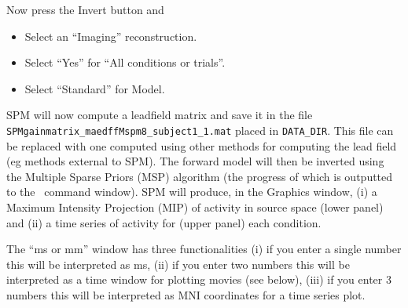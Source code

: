 Now press the Invert button and
\begin{itemize}
\item{Select an ``Imaging'' reconstruction.}
\item{Select ``Yes'' for ``All conditions or trials''.}
\item{Select ``Standard'' for Model.}
\end{itemize}
SPM will now compute a leadfield matrix and save it in the file \texttt{SPMgainmatrix\_maedffMspm8\_subject1\_1.mat} placed in \texttt{DATA\_DIR}. This file can be replaced with one computed using other methods for computing the lead field (eg methods external to SPM). The forward model will then be inverted using the Multiple Sparse Priors (MSP) algorithm (the progress of which is outputted to the \matlab\ command window). SPM will produce, in the Graphics window, (i) a Maximum Intensity Projection (MIP) of activity in source space (lower panel) and (ii) a time series of activity for (upper panel) each condition.

The ``ms or mm'' window has three functionalities (i) if you enter a single number this will be interpreted as ms, (ii) if you enter two numbers this will be interpreted as a time window for plotting movies (see below), (iii) if you enter 3 numbers this will be interpreted as MNI coordinates for a time series plot.


